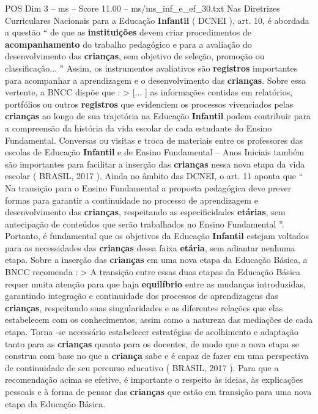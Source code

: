 \begin{textsample}{POS Dim 3 – ms – Score 11.00 – ms/ms\_inf\_e\_ef\_30.txt}
Nas Diretrizes Curriculares Nacionais para a Educação \textbf{Infantil} ( DCNEI ), art. 10, é abordada a questão “ de que as \textbf{instituições} devem criar procedimentos de \textbf{acompanhamento} do trabalho pedagógico e para a avaliação do desenvolvimento das \textbf{crianças}, sem objetivo de seleção, promoção ou classificação... ” Assim, os instrumentos avaliativos são \textbf{registros} importantes para acompanhar a aprendizagem e o desenvolvimento das \textbf{crianças}.
Sobre essa vertente, a BNCC dispõe que : > [... ] as informações contidas em relatórios, portfólios ou outros \textbf{registros} que evidenciem os processos vivenciados pelas \textbf{crianças} ao longo de sua trajetória na Educação \textbf{Infantil} podem contribuir para a compreensão da história da vida escolar de cada estudante do Ensino Fundamental.
Conversas ou visitas e troca de materiais entre os professores das escolas de Educação \textbf{Infantil} e de Ensino Fundamental – Anos Iniciais também são importantes para facilitar a inserção das \textbf{crianças} nessa nova etapa da vida escolar ( BRASIL, 2017 ).
Ainda no âmbito das DCNEI, o art. 11 aponta que “ Na transição para o Ensino Fundamental a proposta pedagógica deve prever formas para garantir a continuidade no processo de aprendizagem e desenvolvimento das \textbf{crianças}, respeitando as especificidades \textbf{etárias}, sem antecipação de conteúdos que serão trabalhados no Ensino Fundamental ”.
Portanto, é fundamental que os objetivos da Educação \textbf{Infantil} estejam voltados para as necessidades das \textbf{crianças} dessa faixa \textbf{etária}, sem adiantar nenhuma etapa.
Sobre a inserção das \textbf{crianças} em uma nova etapa da Educação Básica, a BNCC recomenda : > A transição entre essas duas etapas da Educação Básica requer muita atenção para que haja \textbf{equilíbrio} entre as mudanças introduzidas, garantindo integração e continuidade dos processos de aprendizagens das \textbf{crianças}, respeitando suas singularidades e as diferentes relações que elas estabelecem com os conhecimentos, assim como a natureza das mediações de cada etapa.
Torna -se necessário estabelecer estratégias de acolhimento e adaptação tanto para as \textbf{crianças} quanto para os docentes, de modo que a nova etapa se construa com base no que a \textbf{criança} sabe e é capaz de fazer em uma perspectiva de continuidade de seu percurso educativo ( BRASIL, 2017 ).
Para que a recomendação acima se efetive, é importante o respeito às ideias, às explicações pessoais e à forma de pensar das \textbf{crianças} que estão em transição para uma nova etapa da Educação Básica.

\end{textsample}
